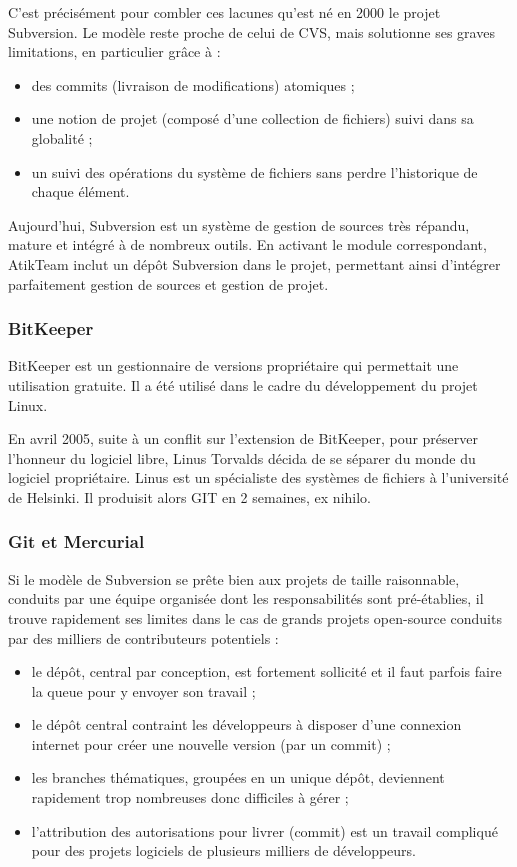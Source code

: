 C'est précisément pour combler ces lacunes qu'est né en 2000 le projet Subversion. Le modèle reste proche de celui de CVS, mais solutionne ses graves limitations, en particulier grâce à :
\begin{itemize}
\item des commits (livraison de modifications) atomiques ;
\item une notion de projet (composé d'une collection de fichiers) suivi dans sa globalité ;
\item un suivi des opérations du système de fichiers sans perdre l'historique de chaque élément.
\end{itemize}

Aujourd'hui, Subversion est un système de gestion de sources très répandu, mature et intégré à de nombreux outils. En activant le module correspondant, AtikTeam inclut un dépôt Subversion dans le projet, permettant ainsi d'intégrer parfaitement gestion de sources et gestion de projet.

\subsubsection{BitKeeper}

BitKeeper est un gestionnaire de versions propriétaire qui permettait une utilisation gratuite. Il a été utilisé dans le cadre du développement du projet Linux. 

En avril 2005, suite à un conflit sur l'extension de BitKeeper, pour préserver l'honneur du logiciel libre, Linus Torvalds décida de se séparer du monde du logiciel propriétaire. Linus est un spécialiste des systèmes de fichiers à l'université de Helsinki. Il produisit alors GIT en 2 semaines, ex nihilo. \cite{Article-git} 

\subsubsection{Git et Mercurial}
Si le modèle de Subversion se prête bien aux projets de taille raisonnable, conduits par une équipe organisée dont les responsabilités sont pré-établies, il trouve rapidement ses limites dans le cas de grands projets open-source conduits par des milliers de contributeurs potentiels :
\begin{itemize}
\item le dépôt, central par conception, est fortement sollicité et il faut parfois faire la queue pour y envoyer son travail ;
\item le dépôt central contraint les développeurs à disposer d'une connexion internet pour créer une nouvelle version (par un commit) ;
\item les branches thématiques, groupées en un unique dépôt, deviennent rapidement trop nombreuses donc difficiles à gérer ;
\item l'attribution des autorisations pour livrer (commit) est un travail compliqué pour des projets logiciels de plusieurs milliers de développeurs.
\end{itemize}

